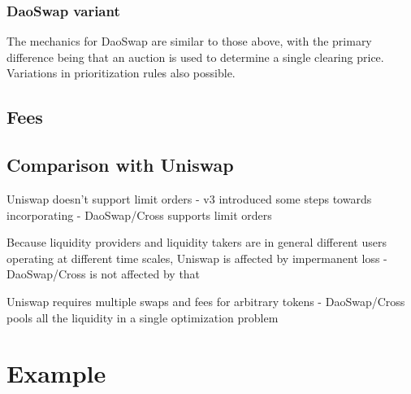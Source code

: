 \documentclass[11pt, reqno]{amsart}
\begin{document}
\subsubsection{DaoSwap variant}
The mechanics for DaoSwap are similar to those above, with the primary
difference being that an auction is used to determine a single clearing price.
Variations in prioritization rules also possible.


\subsection{Fees}


\subsection{Comparison with Uniswap}

Uniswap doesn't support limit orders
- v3 introduced some steps towards incorporating 
- DaoSwap/Cross supports limit orders

Because liquidity providers and liquidity takers are in general different users
operating at different time scales, Uniswap is affected by impermanent loss
- DaoSwap/Cross is not affected by that

Uniswap requires multiple swaps and fees for arbitrary tokens
- DaoSwap/Cross pools all the liquidity in a single optimization problem

\section{Example}




\end{document}

